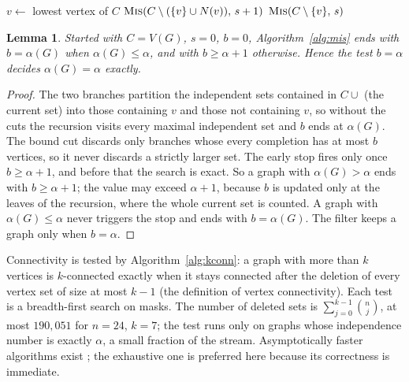 \documentclass[11pt]{article}
\newtheorem{lemma}[theorem]{Lemma}
\theoremstyle{definition}
\theoremstyle{remark}
\begin{document}
\begin{algorithm}[t]
\caption{Independence number with early stop (\texttt{filter2.c}, function \texttt{mis})}\label{alg:mis}
$v\leftarrow$ lowest vertex of $C$\;
$\textsc{Mis}(C\setminus(\{v\}\cup N(v)),\,s+1)$
$\textsc{Mis}(C\setminus\{v\},\,s)$
\end{algorithm}

\begin{lemma}\label{lem:mis}
Started with $C=V(G)$, $s=0$, $b=0$, Algorithm~\ref{alg:mis} ends with $b=\alpha(G)$ when $\alpha(G)\le\alpha$, and
with $b\ge\alpha+1$ otherwise. Hence the test $b=\alpha$ decides $\alpha(G)=\alpha$ exactly.
\end{lemma}

\begin{proof}
The two branches partition the independent sets contained in $C\cup$ (the current set) into those containing $v$ and
those not containing $v$, so without the cuts the recursion visits every maximal independent set and $b$ ends at
$\alpha(G)$. The bound cut discards only branches whose every completion has at most $b$ vertices, so it never
discards a strictly larger set. The early stop fires only once $b\ge\alpha+1$, and before that the search is exact. So a
graph with $\alpha(G)>\alpha$ ends with $b\ge\alpha+1$; the value may exceed $\alpha+1$, because $b$ is updated only at
the leaves of the recursion, where the whole current set is counted. A graph with $\alpha(G)\le\alpha$ never triggers
the stop and ends with $b=\alpha(G)$. The filter keeps a graph only when $b=\alpha$.
\end{proof}

Connectivity is tested by Algorithm~\ref{alg:kconn}: a graph with more than $k$ vertices is $k$-connected exactly when
it stays connected after the deletion of every vertex set of size at most $k-1$ (the definition of vertex connectivity).
Each test is a breadth-first search on masks. The number of deleted sets is $\sum_{j=0}^{k-1}\binom{n}{j}$, at most
$190{,}051$ for $n=24$, $k=7$; the test runs only on graphs whose independence number is exactly $\alpha$, a small
fraction of the stream. Asymptotically faster algorithms exist \cite{EvenTarjan,EsfahanianHakimi}; the exhaustive one
is preferred here because its correctness is immediate.
\end{document}
